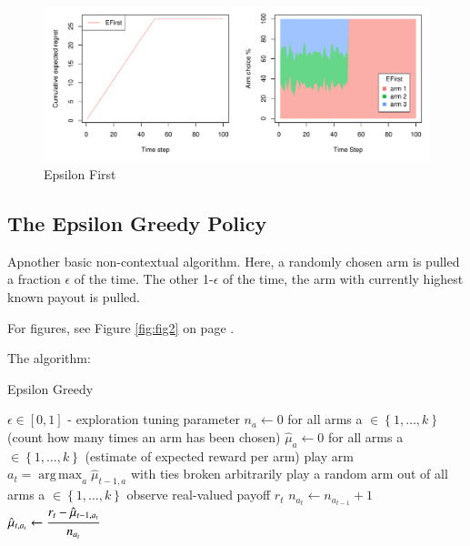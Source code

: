 \documentclass[nojss]{jss}\usepackage[]{graphicx}\usepackage[]{color}
\makeatletter
\def\maxwidth{ %
  \ifdim\Gin@nat@width>\linewidth
    \linewidth
  \else
    \Gin@nat@width
  \fi
}
\newenvironment{knitrout}{}{} %
\DeclareMathOperator*{\argmax}{arg\,max}
\makeatother
\begin{document}
\begin{center}
\begin{knitrout}
\color{fgcolor}\begin{figure}[H]
\includegraphics[width=\maxwidth,]{fig/fig1-1} \caption[Epsilon First]{Epsilon First}\label{fig:fig1}
\end{figure}


\end{knitrout}
\end{center}


\subsection{The Epsilon Greedy Policy}

Apnother basic non-contextual algorithm. Here, a randomly chosen arm is pulled a fraction $\epsilon$ of the time. The other 1-$\epsilon$ of the time, the arm with currently highest known payout is pulled.

For figures, see Figure \ref{fig:fig2} on page \pageref{fig:fig2}.

The algorithm:

\begin{algorithm}[H]
\caption{Epsilon Greedy}
\label{Alg:EpsilonGreedy}
\begin{algorithmic}
\REQUIRE \(    \epsilon  \in \left[ 0,1 \right] \) - exploration tuning parameter
\STATE \( n_{a} \leftarrow 0 \) for all arms a \(  \in \left\{ 1, \dots, k \right\} \)  (count how many times an arm has been chosen)
\STATE \( \hat{\mu}_{a} \leftarrow 0 \) for all arms a  \(   \in \left\{ 1, \dots, k \right\} \)  (estimate of expected reward per arm)
		\STATE play arm \(a_t = \argmax_a  \hat{\mu}_{t-1,a}  \) with ties broken arbitrarily
	\ELSE
		\STATE play a random arm out of all arms a \(  \in \left\{ 1, \dots, k \right\} \)
	\ENDIF
	\STATE observe real-valued payoff $r_t$
	\STATE \( n_{a_{t}} \leftarrow n_{a_{t-1}} + 1  \)
   \STATE \( \hat{\mu}_{t,a_{t}} \leftarrow   \cfrac{r_t - \hat{\mu}_{t-1,a_{t}} }{n_{a_{t}}}   \)
\ENDFOR
\end{algorithmic}
\end{algorithm}
\end{document}
